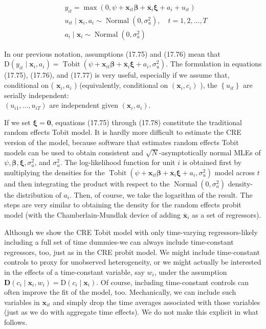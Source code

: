 \documentclass[10pt]{article}
\begin{document}
\begin{align*}
& y_{i t}=\max \left(0, \psi+\mathbf{x}_{i t} \boldsymbol{\beta}+\overline{\mathbf{x}}_{i} \boldsymbol{\xi}+a_{i}+u_{i t}\right)  \tag{17.75}\\
& u_{i t} \mid \mathbf{x}_{i}, a_{i} \sim \operatorname{Normal}\left(0, \sigma_{u}^{2}\right), \quad t=1,2, \ldots, T  \tag{17.76}\\
& a_{i} \mid \mathbf{x}_{i} \sim \operatorname{Normal}\left(0, \sigma_{a}^{2}\right) \tag{17.77}
\end{align*}


In our previous notation, assumptions (17.75) and (17.76) mean that $\mathrm{D}\left(y_{i t} \mid \mathbf{x}_{i}, a_{i}\right) =\operatorname{Tobit}\left(\psi+\mathbf{x}_{i t} \boldsymbol{\beta}+\overline{\mathbf{x}}_{i} \boldsymbol{\xi}+a_{i}, \sigma_{u}^{2}\right)$. The formulation in equations (17.75), (17.76), and (17.77) is very useful, especially if we assume that, conditional on ( $\mathbf{x}_{i}, a_{i}$ ) (equivalently, conditional on $\left(\mathbf{x}_{i}, c_{i}\right)$ ), the $\left\{u_{i t}\right\}$ are serially independent:\\
$\left(u_{i 1}, \ldots, u_{i T}\right)$ are independent given $\left(\mathbf{x}_{i}, a_{i}\right)$.

If we set $\boldsymbol{\xi}=\mathbf{0}$, equations (17.75) through (17.78) constitute the traditional random effects Tobit model. It is hardly more difficult to estimate the CRE version of the model, because software that estimates random effects Tobit models can be used to obtain consistent and $\sqrt{N}$-asymptotically normal MLEs of $\psi, \boldsymbol{\beta}, \boldsymbol{\xi}, \sigma_{a}^{2}$, and $\sigma_{u}^{2}$. The log-likelihood function for unit $i$ is obtained first by multiplying the densities for the $\operatorname{Tobit}\left(\psi+\mathbf{x}_{i t} \boldsymbol{\beta}+\overline{\mathbf{x}}_{i} \boldsymbol{\xi}+a_{i}, \sigma_{u}^{2}\right)$ model across $t$ and then integrating the product with respect to the $\operatorname{Normal}\left(0, \sigma_{a}^{2}\right)$ density-the distribution of $a_{i}$. Then, of course, we take the logarithm of the result. The steps are very similar to obtaining the density for the random effects probit model (with the Chamberlain-Mundlak device of adding $\overline{\mathbf{x}}_{i}$ as a set of regressors).

Although we show the CRE Tobit model with only time-varying regressors-likely including a full set of time dummies-we can always include time-constant regressors, too, just as in the CRE probit model. We might include time-constant controls to proxy for unobserved heterogeneity, or we might actually be interested in the effects of a time-constant variable, say $w_{i}$, under the assumption $\mathbf{D}\left(c_{i} \mid \mathbf{x}_{i}, w_{i}\right)= \mathrm{D}\left(c_{i} \mid \mathbf{x}_{i}\right)$. Of course, including time-constant controls can often improve the fit of the model, too. Mechanically, we can include such variables in $\mathbf{x}_{i t}$ and simply drop the time averages associated with those variables (just as we do with aggregate time effects). We do not make this explicit in what follows.
\end{document}
